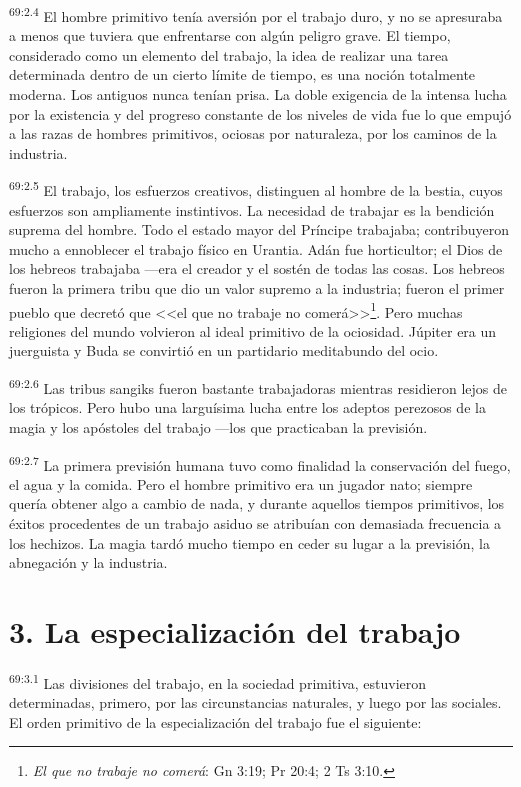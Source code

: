 \documentclass[twoside, 11pt]{book}
\begin{document}
\par
\textsuperscript{69:2.4} El hombre primitivo tenía aversión por el trabajo duro, y no se apresuraba a menos que tuviera que enfrentarse con algún peligro grave. El tiempo, considerado como un elemento del trabajo, la idea de realizar una tarea determinada dentro de un cierto límite de tiempo, es una noción totalmente moderna. Los antiguos nunca tenían prisa. La doble exigencia de la intensa lucha por la existencia y del progreso constante de los niveles de vida fue lo que empujó a las razas de hombres primitivos, ociosas por naturaleza, por los caminos de la industria.

\par
\textsuperscript{69:2.5} El trabajo, los esfuerzos creativos, distinguen al hombre de la bestia, cuyos esfuerzos son ampliamente instintivos. La necesidad de trabajar es la bendición suprema del hombre. Todo el estado mayor del Príncipe trabajaba; contribuyeron mucho a ennoblecer el trabajo físico en Urantia. Adán fue horticultor; el Dios de los hebreos trabajaba ---era el creador y el sostén de todas las cosas. Los hebreos fueron la primera tribu que dio un valor supremo a la industria; fueron el primer pueblo que decretó que <<el que no trabaje no comerá>>\footnote{\textit{El que no trabaje no comerá}: Gn 3:19; Pr 20:4; 2 Ts 3:10.}. Pero muchas religiones del mundo volvieron al ideal primitivo de la ociosidad. Júpiter era un juerguista y Buda se convirtió en un partidario meditabundo del ocio.

\par
\textsuperscript{69:2.6} Las tribus sangiks fueron bastante trabajadoras mientras residieron lejos de los trópicos. Pero hubo una larguísima lucha entre los adeptos perezosos de la magia y los apóstoles del trabajo ---los que practicaban la previsión.

\par
\textsuperscript{69:2.7} La primera previsión humana tuvo como finalidad la conservación del fuego, el agua y la comida. Pero el hombre primitivo era un jugador nato; siempre quería obtener algo a cambio de nada, y durante aquellos tiempos primitivos, los éxitos procedentes de un trabajo asiduo se atribuían con demasiada frecuencia a los hechizos. La magia tardó mucho tiempo en ceder su lugar a la previsión, la abnegación y la industria.

\section*{3. La especialización del trabajo}
\par
\textsuperscript{69:3.1} Las divisiones del trabajo, en la sociedad primitiva, estuvieron determinadas, primero, por las circunstancias naturales, y luego por las sociales. El orden primitivo de la especialización del trabajo fue el siguiente:
\end{document}
